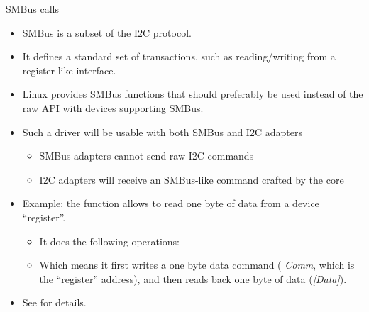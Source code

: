 \begin{frame}{SMBus calls}
  \begin{itemize}
  \item SMBus is a subset of the I2C protocol.
  \item It defines a standard set of transactions, such as
    reading/writing from a register-like interface.
  \item Linux provides SMBus functions that should preferably be used
    instead of the raw API with devices supporting SMBus.
  \item Such a driver will be usable with both SMBus and I2C adapters
    \begin{itemize}
    \item SMBus adapters cannot send raw I2C commands
    \item I2C adapters will receive an SMBus-like command crafted by the
      core
    \end{itemize}
  \item Example: the  function allows
    to read one byte of data from a device ``register''.
    \begin{itemize}
    \item It does the following operations:
    \item Which means it first writes a one byte data command ({\em
        Comm}, which is the ``register'' address), and then reads
      back one byte of data ({\em [Data]}).
    \end{itemize}
  \item See  for details.
  \end{itemize}
\end{frame}

